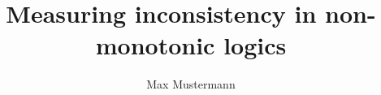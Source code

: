 \documentclass[english,m,seminar,palatino]{AIGpaper}
\author{Max Mustermann}
\title{Measuring inconsistency in non-monotonic logics}
\begin{document}
\maketitle %





\makestatement
\end{document}
